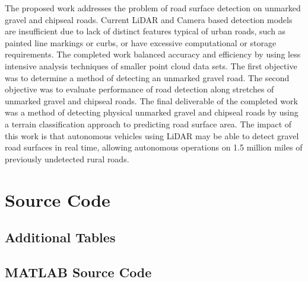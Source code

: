 \documentclass[numbered,pdftex]{ohio-etd}
\begin{document}
{{	{The proposed work addresses the problem of road surface detection on unmarked gravel and chipseal roads. Current LiDAR and Camera based detection models are insufficient due to lack of distinct features typical of urban roads, such as painted line markings or curbs, or have excessive computational or storage requirements. The completed work balanced accuracy and efficiency by using less intensive analysis techniques of smaller point cloud data sets. The first objective was to determine a method of detecting an unmarked gravel road. The second objective was to evaluate performance of road detection along stretches of unmarked gravel and chipseal roads. The final deliverable of the completed work was a method of detecting physical unmarked gravel and chipseal roads by using a terrain classification approach to predicting road surface area. The impact of this work is that autonomous vehicles using LiDAR may be able to detect gravel road surfaces in real time, allowing autonomous operations on 1.5 million miles of previously undetected rural roads.}

}


\appendix

\chapter{Source Code}{
	
	\section{Additional Tables}{
	
	
	
	}
	
	\section{MATLAB Source Code}{
		
%			
%			
%			
%			
%				
		
}}}
\end{document}

